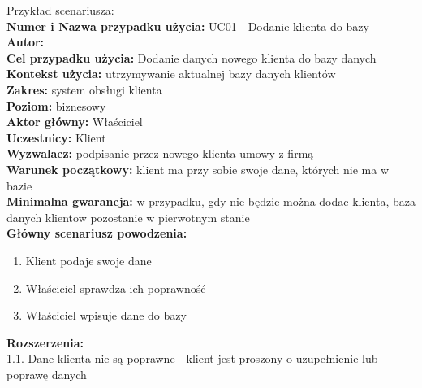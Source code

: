 Przykład scenariusza: \\
\textbf{Numer i Nazwa przypadku użycia:} UC01 - Dodanie klienta do bazy \\
\textbf{Autor:} \\
\textbf{Cel przypadku użycia:} Dodanie danych nowego klienta do bazy danych \\
\textbf{Kontekst użycia:} utrzymywanie aktualnej bazy danych klientów \\
\textbf{Zakres:} system obsługi klienta \\
\textbf{Poziom:} biznesowy \\
\textbf{Aktor główny:} Właściciel \\
\textbf{Uczestnicy:} Klient \\
\textbf{Wyzwalacz:} podpisanie przez nowego klienta umowy z firmą \\
\textbf{Warunek początkowy:} klient ma przy sobie swoje dane, których nie ma w bazie \\
\textbf{Minimalna gwarancja:} w przypadku, gdy nie będzie można dodac klienta, baza danych klientow pozostanie w pierwotnym stanie \\
\textbf{Główny scenariusz powodzenia:} \\
	\begin{enumerate}
		\item Klient podaje swoje dane
		\item Właściciel sprawdza ich poprawność
		\item Właściciel wpisuje dane do bazy 
	\end{enumerate}
\textbf{Rozszerzenia:} \\
1.1. Dane klienta nie są poprawne - klient jest proszony o uzupełnienie lub poprawę danych
